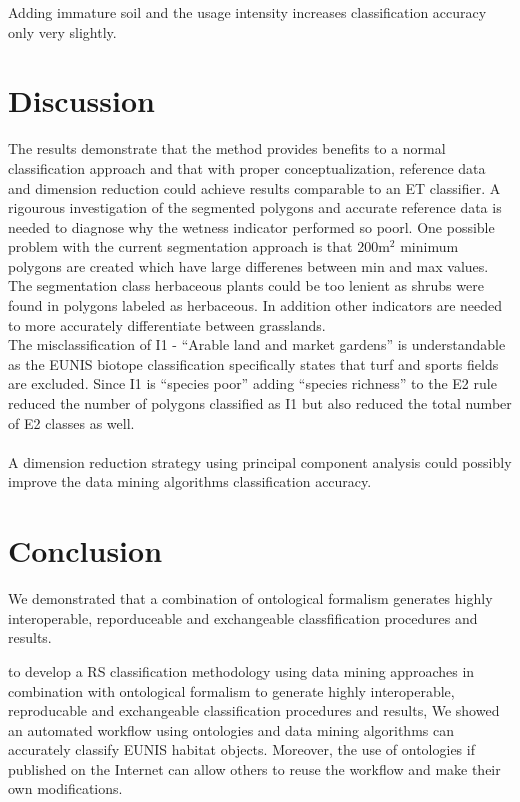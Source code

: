 \documentclass[authoryear, review,12pt,number]{elsarticle}
\begin{document}
Adding immature soil and the usage intensity increases classification accuracy 
only very slightly.

\section{Discussion}
The results demonstrate that the method provides benefits to a normal
classification approach and that with proper conceptualization, reference data
and dimension reduction could achieve results comparable to an ET classifier. A
rigourous investigation of the segmented polygons and accurate reference data is
needed to diagnose why the wetness indicator performed so poorl. One possible
problem with the current segmentation approach is that 200m$^{2}$ minimum
polygons are created which have large differenes between min and max values. The
segmentation class herbaceous plants could be too lenient as shrubs were found
in polygons labeled as herbaceous. In addition other indicators are needed to
more accurately differentiate between grasslands.
\\
The misclassification of I1 - ``Arable land and market gardens'' is 
understandable as the EUNIS biotope classification specifically states that 
turf and sports fields are excluded. Since I1 is ``species poor'' adding 
``species richness'' to the E2 rule reduced the number of polygons classified 
as I1 but also reduced the total number of E2 classes as well.\\
\\
A dimension reduction strategy using principal component analysis could possibly
improve the data mining algorithms classification accuracy.
\section{Conclusion}
We demonstrated that a combination of ontological formalism generates highly
interoperable, reporduceable and exchangeable classfification procedures and
results.

 to develop a RS classification methodology using data mining approaches
     in combination with ontological formalism to generate highly interoperable,
     reproducable and exchangeable classification procedures and results,
We showed an automated workflow using ontologies and data mining algorithms can 
accurately classify EUNIS habitat objects. Moreover, the use of ontologies if 
published on the Internet can allow others to reuse the workflow and make their 
own modifications. 
\end{document}
